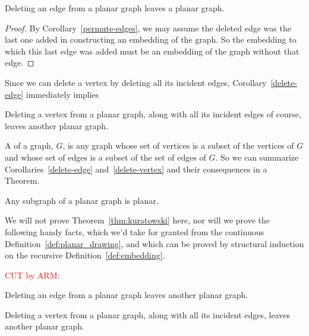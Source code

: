 \begin{editingnotes}
\begin{corollary}\label{delete-edge}
Deleting an edge from a planar graph leaves a planar graph.

\begin{proof}
  By Corollary~\ref{permute-edges}, we may assume the deleted edge was the
  last one added in constructing an embedding of the graph.  So the
  embedding to which this last edge was added must be an embedding of the
  graph without that edge.
\end{proof}

\end{corollary}

Since we can delete a vertex by deleting all its incident edges,
Corollary~\ref{delete-edge} immediately implies

\begin{corollary}\label{delete-vertex}
Deleting a vertex from a planar graph, along with all its incident
edges of course, leaves another planar graph.
\end{corollary}

A  of a graph, $G$, is any graph whose set of vertices is a
subset of the vertices of $G$ and whose set of edges is a subset of the
set of edges of $G$.  So we can summarize Corollaries~\ref{delete-edge}
and~\ref{delete-vertex} and their consequences in a Theorem.

\begin{theorem}\label{planar-subgraph}
  Any subgraph of a planar graph is planar.
\end{theorem}

\end{editingnotes}

We will not prove Theorem~\ref{thm:kuratowski} here, nor will we
prove the following handy facts, which we'd take for granted from the
continuous Definition~\ref{def:planar_drawing}, and which can be proved
by structural induction on the recursive Definition~\ref{def:embedding}.

\begin{editingnotes}
\textcolor{red}{CUT by ARM:}

\begin{lemma}\label{lem:deleting_planar_edge}
Deleting an edge from a planar graph leaves another planar graph.
\end{lemma}

\begin{corollary}\label{delete-vertex}
Deleting a vertex from a planar graph, along with all its incident
edges, leaves another planar graph.
\end{corollary}
\end{editingnotes}

